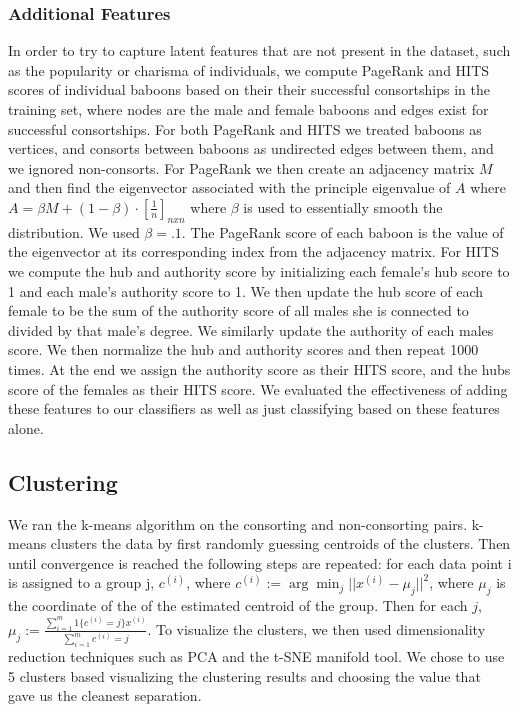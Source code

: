 \documentclass[twoside,twocolumn,paper=letter,fontsize=11pt]{article}
\begin{document}
\subsubsection*{Additional Features}

In order to try to capture latent features that are not present in the dataset,
such as the popularity or charisma of individuals, we compute PageRank and HITS scores of individual baboons based on their their successful consortships in the
training set, where nodes are the male and female baboons and edges exist for
successful consortships.  For both PageRank and HITS we treated baboons as vertices, and consorts between baboons as undirected edges between them, and we ignored non-consorts. For PageRank we then create an adjacency matrix $M$ and then find the eigenvector associated with the principle eigenvalue of $A$ where $A=\beta M+(1-\beta)\cdot[\frac{1}{n}]_{nxn}$ where $\beta$ is used to essentially smooth the distribution. We used $\beta=.1$. The PageRank score of each baboon is the value of the eigenvector at its corresponding index from the adjacency matrix. For HITS we compute the hub and authority score by initializing each female's hub score to 1 and each male's authority score to 1. We then update the hub score of each female to be the sum of the authority score of all males she is connected to divided by that male's degree. We similarly update the authority of each males score. We then normalize the hub and authority scores and then repeat 1000 times. At the end we assign the authority score as their HITS score, and the hubs score of the females as their HITS score.
We evaluated the effectiveness of adding these features to our classifiers as well
as just classifying based on these features alone.

\subsection{Clustering}

We ran the k-means algorithm on the consorting and
non-consorting pairs. k-means clusters the data by first randomly guessing
centroids of the clusters. Then until convergence is reached the following steps
are repeated: for each data
point i is assigned to a group j, $c^{(i)}$, where
$c^{(i)}:=\arg\min_{j}||x^{(i)}-\mu_j||^2$, where $\mu_j$ is the coordinate of
the of the estimated centroid of the group. Then for each $j$,
$\mu_j:=\frac{\sum_{i=1}^m1\{c^{(i)}=j\}x^{(i)}}{\sum_{i=1}^m{c^{(i)}=j}}$.
To visualize the clusters, we then used dimensionality
reduction techniques such as PCA and the t-SNE manifold tool. We chose to use 5
clusters based visualizing the clustering results and choosing the value that
gave us the cleanest separation.
\end{document}
